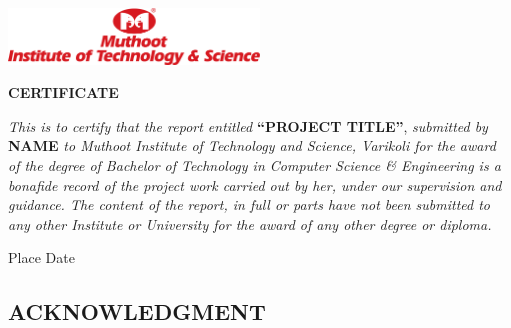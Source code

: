 \documentclass[a4paper,12pt]{report}
\begin{document}
\begin{titlepage}
    \vspace{1.5cm}
    \begin{center}
        \includegraphics[width=0.50\textwidth]{images/MITS.png}\par\vspace{1cm}
        {\scshape \Large \bfseries CERTIFICATE \par}
    \end{center}

    \textit{This is to certify that the report entitled} \textbf{“PROJECT TITLE”}, \textit{submitted by} \textbf{NAME  } \textit{to Muthoot Institute of Technology and Science, Varikoli for the award of the degree of Bachelor of Technology in Computer Science \&  Engineering is a bonafide record of the project work carried out by her, under our supervision and guidance. The content of the report, in full or parts have not been submitted to any other Institute or University for the award of any other degree or diploma.}
    \vspace{2.5cm}
    \newline \noindent
    \newline

    \vspace{3cm}

    {\noindent Place \newline \noindent Date}

    \vspace{3cm}
    \noindent


\end{titlepage}



\newpage
{}
\setcounter{page}{1}
\thispagestyle{plain}

\begin{center}
    \section*{ACKNOWLEDGMENT}
\end{center}
\end{document}
